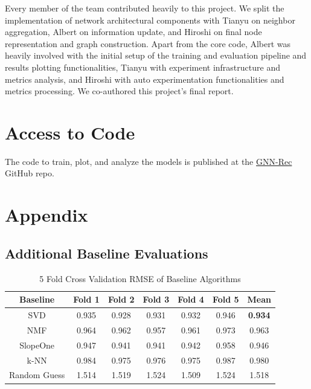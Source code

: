 \documentclass{article}
\begin{document}
Every member of the team contributed heavily to this project. We split the implementation of network architectural components with Tianyu on neighbor aggregation, Albert on information update, and Hiroshi on final node representation and graph construction. Apart from the core code, Albert was heavily involved with the initial setup of the training and evaluation pipeline and results plotting functionalities, Tianyu with experiment infrastructure and metrics analysis, and Hiroshi with auto experimentation functionalities and metrics processing. We co-authored this project's final report.

\section{Access to Code}


The code to train, plot, and analyze the models is published at the \href{https://github.com/thisisalbertliang/gnn-rec}{GNN-Rec} GitHub repo.

\newpage

\section{Appendix}




\subsection{Additional Baseline Evaluations} \label{additional-baseline-eval}



\begin{table}[H]
    \centering
        \begin{tabular}{|c c c c c c c|} 
         \hline
         Baseline & Fold 1 & Fold 2 & Fold 3 & Fold 4 & Fold 5 & Mean \\ [0.5ex] 
         \hline\hline
         SVD & 0.935 & 0.928 & 0.931 & 0.932 & 0.946 & \bfseries 0.934 \\ 
         \hline
         NMF & 0.964 & 0.962 & 0.957 & 0.961 & 0.973 & 0.963 \\
         \hline
         SlopeOne & 0.947 & 0.941 & 0.941 & 0.942 & 0.958 & 0.946 \\
         \hline
         k-NN & 0.984 & 0.975 & 0.976 & 0.975 & 0.987 & 0.980 \\
         \hline
         Random Guess & 1.514 & 1.519 & 1.524 & 1.509 & 1.524 & 1.518 \\ [1ex] 
         \hline
        \end{tabular}
    \caption{5 Fold Cross Validation RMSE of Baseline Algorithms}
    \label{tab:rmse_results}
\end{table}
\end{document}
